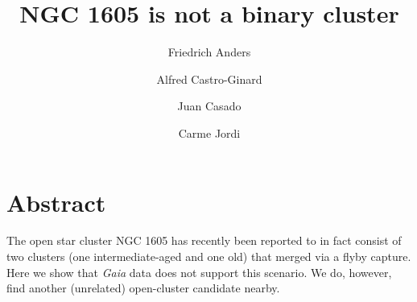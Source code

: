 \documentclass[RNAAS]{aastex631}
\begin{document}
\title{NGC 1605 is not a binary cluster}


\author[0000-0003-4524-9363]{Friedrich Anders}

\author[0000-0002-9419-3725]{Alfred Castro-Ginard}

\author[0000-0003-4105-2520]{Juan Casado}

\author[0000-0001-5495-9602]{Carme Jordi}


\section{Abstract}
The open star cluster NGC 1605 has recently been reported to in fact consist of two clusters (one intermediate-aged and one old) that merged via a flyby capture. Here we show that {\it Gaia} data does not support this scenario. We do, however, find another (unrelated) open-cluster candidate nearby.
\end{document}
